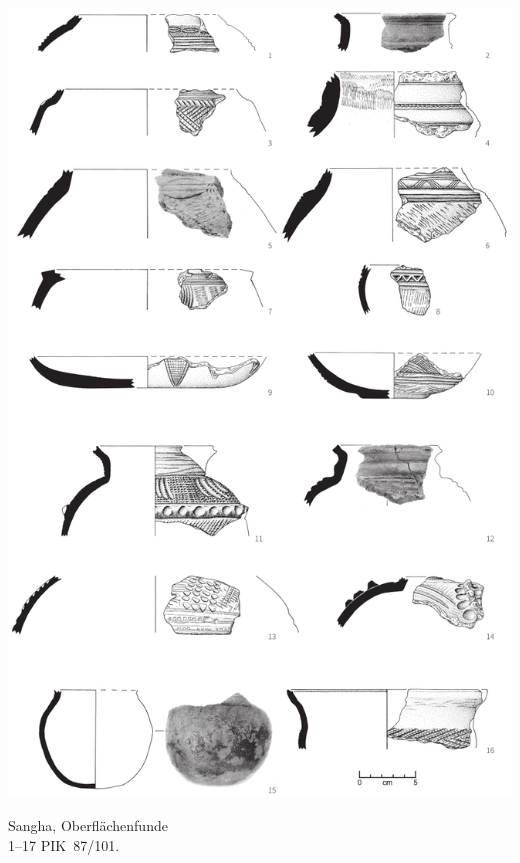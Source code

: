 \begin{pl}[H]
	\includegraphics{plt/Taf55.pdf}
	\vspace{.75em}\caption{\mbox{Sangha}, Oberflächenfunde \\ 1--17 PIK~87/101.}
	\label{pl:55}
\end{pl}

